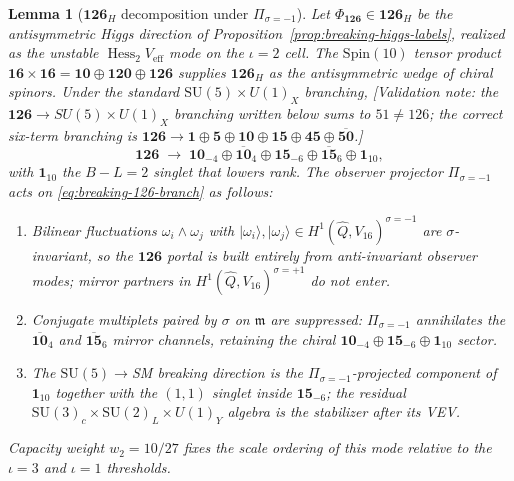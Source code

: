 \documentclass[aps,prd,onecolumn,amsmath,amssymb,nofootinbib,11pt]{revtex4-2}
\numberwithin{equation}{section}
\theoremstyle{plain}
\newtheorem{lemma}[theorem]{Lemma}
\theoremstyle{definition}
\theoremstyle{remark}
\newcommand{\Spin}{\mathrm{Spin}}
\newcommand{\Hess}{\operatorname{Hess}}
\begin{document}
\begin{lemma}[$\mathbf{126}_H$ decomposition under $\Pi_{\sigma=-1}$]
\label{lem:breaking-126-sigma}
Let $\Phi_{\mathbf{126}}\in\mathbf{126}_H$ be the antisymmetric Higgs direction
of Proposition~\ref{prop:breaking-higgs-labels}, realized as the unstable
$\Hess_2 V_{\mathrm{eff}}$ mode on the $\iota=2$ cell. The $\Spin(10)$ tensor
product $\mathbf{16}\times\mathbf{16}=\mathbf{10}\oplus\mathbf{120}\oplus
\mathbf{126}$ supplies $\mathbf{126}_H$ as the antisymmetric wedge of chiral
spinors. Under the standard $\mathrm{SU}(5)\times U(1)_X$ branching,
\noindent\emph{[Validation note: the $\mathbf{126}\to SU(5)\times U(1)_X$ branching written below sums to $51\neq126$; the correct six-term branching is $\mathbf{126}\to\mathbf{1}\oplus\mathbf{5}\oplus\mathbf{10}\oplus\mathbf{15}\oplus\mathbf{45}\oplus\overline{\mathbf{50}}$.]}
\begin{equation}\label{eq:breaking-126-branch}
  \mathbf{126}
  \;\longrightarrow\;
  \mathbf{10}_{-4}\oplus\overline{\mathbf{10}}_{4}
  \oplus\mathbf{15}_{-6}\oplus\overline{\mathbf{15}}_{6}
  \oplus\mathbf{1}_{10},
\end{equation}
with $\mathbf{1}_{10}$ the $B\!-\!L=2$ singlet that lowers rank. The observer
projector $\Pi_{\sigma=-1}$ acts on \eqref{eq:breaking-126-branch} as follows:
\begin{enumerate}[label=(\roman*),leftmargin=*]
  \item Bilinear fluctuations $\omega_i\wedge\omega_j$ with
    $|\omega_i\rangle,|\omega_j\rangle\in H^1(\hat Q,V_{16})^{\sigma=-1}$
    are $\sigma$-invariant, so the $\mathbf{126}$ portal is built entirely from
    anti-invariant observer modes; mirror partners in
    $H^1(\hat Q,V_{16})^{\sigma=+1}$ do not enter.
  \item Conjugate multiplets paired by $\sigma$ on $\mathfrak{m}$ are suppressed:
    $\Pi_{\sigma=-1}$ annihilates the $\overline{\mathbf{10}}_{4}$ and
    $\overline{\mathbf{15}}_{6}$ mirror channels, retaining the chiral
    $\mathbf{10}_{-4}\oplus\mathbf{15}_{-6}\oplus\mathbf{1}_{10}$ sector.
  \item The $\mathrm{SU}(5)\to$SM breaking direction is the
    $\Pi_{\sigma=-1}$-projected component of $\mathbf{1}_{10}$ together with
    the $(1,1)$ singlet inside $\mathbf{15}_{-6}$; the residual
    $\mathrm{SU}(3)_c\times\mathrm{SU}(2)_L\times U(1)_Y$ algebra is the
    stabilizer after its VEV.
\end{enumerate}
Capacity weight $w_2=10/27$ fixes the scale ordering of this mode relative to
the $\iota=3$ and $\iota=1$ thresholds.
\end{lemma}
\end{document}
